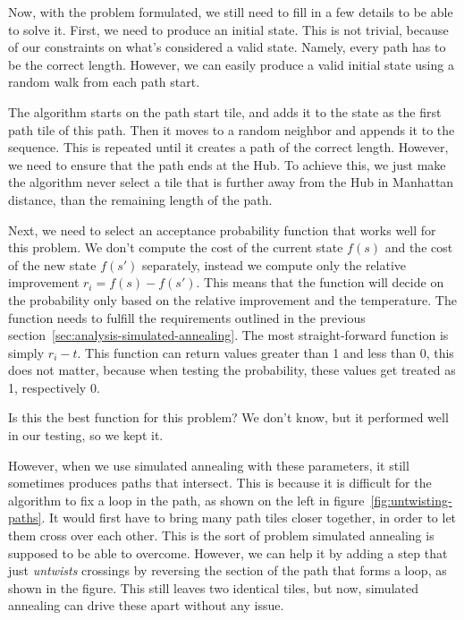 Now, with the problem formulated, we still need to fill in a few details to be able to solve it.
First, we need to produce an initial state.
This is not trivial, because of our constraints on what's considered a valid state.
Namely, every path has to be the correct length.
However, we can easily produce a valid initial state using a random walk from each path start.

The algorithm starts on the path start tile, and adds it to the state as the first path tile of this path.
Then it moves to a random neighbor and appends it to the sequence.
This is repeated until it creates a path of the correct length.
However, we need to ensure that the path ends at the Hub.
To achieve this, we just make the algorithm never select a tile that is further away from the Hub in Manhattan distance, than the remaining length of the path.

Next, we need to select an acceptance probability function that works well for this problem.
We don't compute the cost of the current state $f(s)$ and the cost of the new state $f(s')$ separately, instead we compute only the relative improvement $r_i = f(s) - f(s')$.
This means that the function will decide on the probability only based on the relative improvement and the temperature.
The function needs to fulfill the requirements outlined in the previous section~\ref{sec:analysis-simulated-annealing}.
The most straight-forward function is simply $r_i - t$.
This function can return values greater than 1 and less than 0, this does not matter, because when testing the probability, these values get treated as 1, respectively 0.

Is this the best function for this problem?
We don't know, but it performed well in our testing, so we kept it.

However, when we use simulated annealing with these parameters, it still sometimes produces paths that intersect.
This is because it is difficult for the algorithm to fix a loop in the path, as shown on the left in figure~\ref{fig:untwisting-paths}.
It would first have to bring many path tiles closer together, in order to let them cross over each other.
This is the sort of problem simulated annealing is supposed to be able to overcome.
However, we can help it by adding a step that just \emph{untwists} crossings by reversing the section of the path that forms a loop, as shown in the figure.
This still leaves two identical tiles, but now, simulated annealing can drive these apart without any issue.

